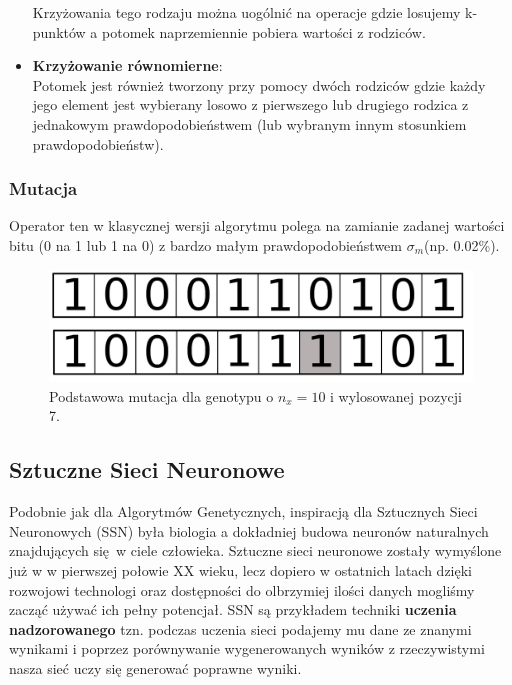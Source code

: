 \documentclass{article}
\begin{document}
\begin{itemize}
Krzyżowania tego rodzaju można uogólnić na operacje gdzie losujemy k-punktów
a potomek naprzemiennie pobiera wartości z rodziców.\\
\item \textbf{Krzyżowanie równomierne}:\\
Potomek jest również tworzony przy pomocy dwóch rodziców gdzie każdy jego element jest
wybierany losowo z pierwszego lub drugiego rodzica z jednakowym prawdopodobieństwem 
(lub wybranym innym stosunkiem prawdopodobieństw).

\end{itemize}

\subsubsection{Mutacja}
Operator ten w klasycznej wersji algorytmu polega na zamianie zadanej wartości bitu
(0 na 1 lub 1 na 0) z bardzo małym  prawdopodobieństwem $\sigma_m$(np. 0.02\%).
\begin{figure}[H]
\centering
\includegraphics[scale=0.2]{mutation_v2.png}
\caption{Podstawowa mutacja dla genotypu o $n_x = 10$ i wylosowanej pozycji 7.}
\end{figure}



\subsection{Sztuczne Sieci Neuronowe}
\label{sec:ssn}
Podobnie jak dla Algorytmów Genetycznych, inspiracją dla Sztucznych Sieci Neuronowych (SSN) 
była biologia a dokładniej budowa neuronów naturalnych znajdujących się w ciele człowieka.
Sztuczne sieci neuronowe zostały wymyślone już w w pierwszej połowie XX wieku, lecz dopiero w ostatnich latach
dzięki rozwojowi technologi oraz dostępności do olbrzymiej ilości danych mogliśmy zacząć używać
ich pełny potencjał. SSN są przykładem techniki \textbf{uczenia nadzorowanego} tzn.
podczas uczenia sieci podajemy mu dane ze znanymi wynikami i poprzez porównywanie wygenerowanych
wyników z rzeczywistymi nasza sieć uczy się generować poprawne wyniki.
\end{document}

